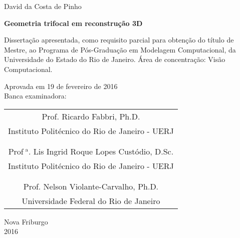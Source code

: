 \thispagestyle{empty}

\begin{center}
David da Costa de Pinho

\vspace{2 cm}

{\bf Geometria trifocal em reconstrução 3D}
\end{center}

\vspace{2 cm}

\begin{flushright}
\begin{minipage}{.5\textwidth}
Dissertação apresentada, como
requisito parcial para obtenção do título de Mestre, ao Programa de Pós-Graduação em Modelagem Computacional, da Universidade do Estado do Rio de Janeiro. Área de concentração: Visão Computacional.
\end{minipage}
\end{flushright}

\begin{flushleft}
Aprovada em 19 de fevereiro de 2016\\
Banca examinadora:
\end{flushleft}

\vspace{1 cm}

\begin{center}
\begin{tabular}{c}
\hline
Prof. Ricardo Fabbri, Ph.D.\\
Instituto Politécnico do Rio de Janeiro - UERJ\\\\\\

\hline
Prof$^{\,\,\text{a}}$. Lis Ingrid Roque Lopes Custódio, D.Sc.\\
Instituto Politécnico do Rio de Janeiro - UERJ\\\\\\

\hline
Prof. Nelson Violante-Carvalho, Ph.D.\\
Universidade Federal do Rio de Janeiro
\end{tabular}
\end{center}

\vspace{3 cm}

\begin{center}
Nova Friburgo\\
2016
\end{center}



